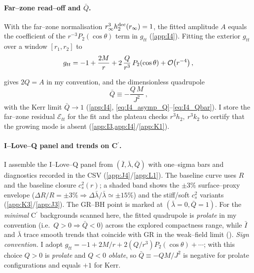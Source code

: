 \documentclass{iopjournal}
\begin{document}
\paragraph{Far–zone read–off and \(\bar Q\).}
With the far–zone normalisation \(r_\infty^{3}h_2^{\rm dec}(r_\infty)=1\), the fitted amplitude \(A\) equals the coefficient of the \(r^{-3}P_2(\cos\theta)\) term in \(g_{tt}\) (\cref{app:I4}). Fitting the exterior \(g_{tt}\) over a window \([r_1,r_2]\) to
\begin{equation}
g_{tt}=-1+\frac{2M}{r}+2\,\frac{Q}{r^{3}}\,P_{2}(\cos\theta)+\order{r^{-4}}\,,
\label{eq:12_asymp_Q}
\end{equation}

gives \(2Q=A\) in my convention, and the dimensionless quadrupole
\begin{equation}
\boxed{\ \bar{Q}\equiv-\frac{Q\,M}{J^{2}}\ } ,
\label{eq:12_Qbar}
\end{equation}
with the Kerr limit \(\bar{Q}\to1\) (\cref{app:I4}, \eqref{eq:I4_asymp_Q}–\eqref{eq:I4_Qbar}). I store the far–zone residual \(\mathcal E_{tt}\) for the fit and the plateau checks \(r^{3}h_2,\ r^{3}k_2\) to certify that the growing mode is absent (\cref{app:I3,app:I4}/\cref{app:K1}).

\paragraph{I–Love–Q panel and trends on C$^\prime$.}
I assemble the I–Love–Q panel from \((\bar{I},\bar\lambda,\bar{Q})\) with one–sigma bars and diagnostics recorded in the CSV (\cref{app:J4}/\cref{app:L1}). The baseline curve uses \(R\) and the baseline closure \(c_s^2(r)\); a shaded band shows the \(\pm3\%\) surface–proxy envelope (\(\Delta R/R=\pm3\%\Rightarrow\Delta \bar \lambda/\bar \lambda\simeq\pm15\%\)) and the stiff/soft \(c_s^2\) variants (\cref{app:K3}/\cref{app:J3}). The GR–BH point is marked at \((\bar \lambda=0,\bar{Q}=1)\). For the \emph{minimal} C$^\prime$ backgrounds scanned here, the fitted quadrupole is \emph{prolate} in my convention (i.e.\ \(Q>0\Rightarrow\bar{Q}<0\)) across the explored compactness range, while \(\bar{I}\) and \(\bar \lambda\) trace smooth trends that coincide with GR in the weak–field limit ().
\noindent\emph{Sign convention.}
I adopt $g_{tt}=-1+2M/r+2(Q/r^{3})P_2(\cos\theta)+\cdots$; with this choice $Q>0$ is \emph{prolate} and $Q<0$ \emph{oblate}, so $\bar{Q}\equiv- QM/J^{2}$ is negative for prolate configurations and equals $+1$ for Kerr.
\end{document}

